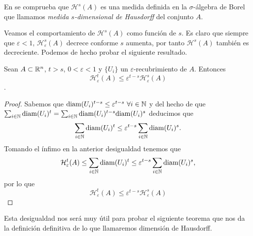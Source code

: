 En \cite[Secciones 5.2 y 5.4]{alma991007022459704990} se comprueba que $\mathcal{H}^s(A)$ es una medida definida en la $\sigma$-álgebra de Borel que llamamos \textit{medida $s$-dimensional de Hausdorff} del conjunto $A$.

Veamos el comportamiento de $\mathcal{H}^s(A)$ como función de $s$. Es claro que siempre que $\varepsilon < 1$, $\mathcal{H}_\varepsilon^s(A)$ decrece conforme $s$ aumenta, por tanto $\mathcal{H}^s(A)$ también es decreciente. Podemos de hecho probar el siguiente resultado.

\begin{proposicion}
  \label{prop:desigualdad}
  Sean $A\subset \mathbb{R}^n$, $t>s$, $0<\varepsilon<1$ y $\{U_i\}$ un $\varepsilon$-recubrimiento de $A$. Entonces 
  $$\mathcal{H}_\varepsilon^t(A)\leq \varepsilon^{t-s}\mathcal{H}_\varepsilon^s(A)$$. 
\end{proposicion}
\begin{proof}
  Sabemos que $\mathrm{diam}(U_i)^{t-s}\leq\varepsilon^{t-s} \ \forall i\in \mathbb{N}$ y del hecho de que $\sum_{i\in\mathbb{N}}\mathrm{diam}(U_i)^t=\sum_{i\in\mathbb{N}}\mathrm{diam}(U_i)^{t-s}\mathrm{diam}(U_i)^s$ deducimos que 
  $$
  \sum_{i\in\mathbb{N}}\mathrm{diam}(U_i)^t\leq\varepsilon^{t-s}\sum_{i\in\mathbb{N}}\mathrm{diam}(U_i)^{s}.
  $$
  Tomando el ínfimo en la anterior desigualdad tenemos que
  $$
  \mathcal{H}_\varepsilon^t(A)\leq\sum_{i\in\mathbb{N}}\mathrm{diam}(U_i)^t\leq\varepsilon^{t-s}\sum_{i\in\mathbb{N}}\mathrm{diam}(U_i)^{s},
  $$
  por lo que
  $$\mathcal{H}_\varepsilon^t(A)\leq \varepsilon^{t-s}\mathcal{H}_\varepsilon^s(A)$$

\end{proof}

Esta desigualdad nos será muy útil para probar el siguiente teorema que nos da la definición definitiva de lo que llamaremos dimensión de Hausdorff.

